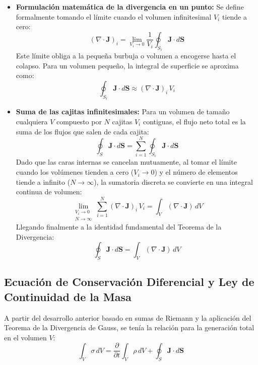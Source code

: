 \documentclass[11pt,letterpaper]{article}
\begin{document}
\begin{itemize}
    \item \textbf{Formulación matemática de la divergencia en un punto:} Se define formalmente tomando el límite cuando el volumen infinitesimal $V_i$ tiende a cero:
    \begin{equation}
        (\nabla \cdot \mathbf{J})_i = \lim_{V_i \to 0} \frac{1}{V_i} \oint_{S_i} \mathbf{J} \cdot d\mathbf{S}
    \end{equation}
    Este límite obliga a la pequeña burbuja o volumen a encogerse hasta el colapso. Para un volumen pequeño, la integral de superficie se aproxima como:
    \begin{equation}
        \oint_{S_i} \mathbf{J} \cdot d\mathbf{S} \approx (\nabla \cdot \mathbf{J})_i \, V_i
    \end{equation}

    \item \textbf{Suma de las cajitas infinitesimales:} Para un volumen de tamaño cualquiera $V$ compuesto por $N$ cajitas $V_i$ contiguas, el flujo neto total es la suma de los flujos que salen de cada cajita:
    \begin{equation}
        \oint_S \mathbf{J} \cdot d\mathbf{S} = \sum_{i=1}^{N} \oint_{S_i} \mathbf{J} \cdot d\mathbf{S}
    \end{equation}
    Dado que las caras internas se cancelan mutuamente, al tomar el límite cuando los volúmenes tienden a cero ($V_i \to 0$) y el número de elementos tiende a infinito ($N \to \infty$), la sumatoria discreta se convierte en una integral continua de volumen:
    \begin{equation}
        \lim_{\substack{V_i \to 0 \\ N \to \infty}} \sum_{i=1}^{N} (\nabla \cdot \mathbf{J})_i \, V_i = \int_V (\nabla \cdot \mathbf{J}) \, dV
    \end{equation}
    Llegando finalmente a la identidad fundamental del Teorema de la Divergencia:
    \begin{equation}
        \oint_S \mathbf{J} \cdot d\mathbf{S} = \int_V (\nabla \cdot \mathbf{J}) \, dV
    \end{equation}
\end{itemize}

\subsection{Ecuación de Conservación Diferencial y Ley de Continuidad de la Masa}

A partir del desarrollo anterior basado en sumas de Riemann y la aplicación del Teorema de la Divergencia de Gauss, se tenía la relación para la generación total en el volumen $V$:
\begin{equation}
    \int_V \sigma \, dV = \frac{\partial}{\partial t} \int_V \rho \, dV + \oint_S \mathbf{J} \cdot d\mathbf{S}
\end{equation}
\end{document}
